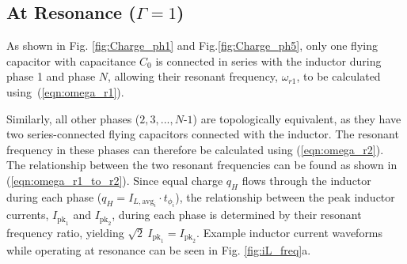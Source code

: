 \vspace{-10pt}
\subsection{At Resonance {\normalfont ($\Gamma=1$)}}
\vspace{-0.75em}


As shown in Fig. \ref{fig:Charge_ph1} and Fig.\ref{fig:Charge_ph5}, only one flying capacitor with capacitance $C_0$ is connected in series with the inductor during phase 1 and phase $N$, allowing their resonant frequency, $\omega_{r1}$, to be calculated using~(\ref{eqn:omega_r1}).


Similarly, all other phases ($2, 3,...,N\textrm{-}1$) are topologically equivalent, as they have two series-connected flying capacitors connected with the inductor. The resonant frequency in these phases can therefore be calculated using (\ref{eqn:omega_r2}).
The relationship between the two resonant frequencies can be found as shown in (\ref{eqn:omega_r1_to_r2}).
Since equal charge $q_H$ flows through the inductor during each phase ($q_{H} = I_{L,\textrm{avg}_i}\cdot t_{\phi_i}$), the relationship between the peak inductor currents, $I_{\textrm{pk}_1}$ and $I_{\textrm{pk}_2}$, during each phase is determined by their resonant frequency ratio, yielding $\sqrt{2}\ I_{\textrm{pk}_1} = I_{\textrm{pk}_2}$. Example inductor current waveforms while operating at resonance can be seen in Fig. \ref{fig:iL_freq}a.






